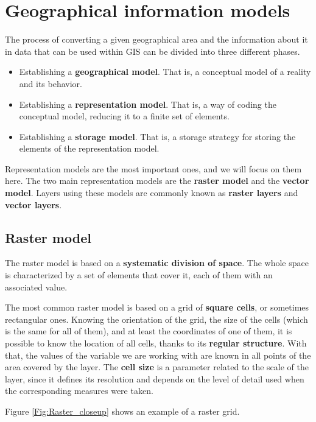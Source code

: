 \section{Geographical information models}

The process of converting a given geographical area and the information about it in data that can be used within GIS can be divided into three different phases.

\begin{itemize}
 \item Establishing a \textbf{geographical model}. That is, a conceptual model of a reality and its behavior.
\item Establishing a \textbf{representation model}. That is, a way of coding the conceptual model, reducing it to a finite set of elements.
\item Establishing a \textbf{storage model}. That is, a storage strategy for storing the elements of the representation model.
\end{itemize}

Representation models are the most important ones, and we will focus on them here. The two main representation models are the \textbf{raster model} and the \textbf{vector model}. Layers using these models are commonly known as \textbf{raster layers} and \textbf{vector layers}.

\subsection{Raster model}

The raster model is based on a \textbf{systematic division of space}. The whole space is characterized by a set of elements that cover it, each of them with an associated value.

The most common raster model is based on a grid of \textbf{square cells}, or sometimes rectangular ones. Knowing the orientation of the grid, the size of the cells (which is the same for all of them), and at least the coordinates of one of them, it is possible to know the location of all cells, thanks to its \textbf{regular structure}. With that, the values of the variable we are working with are known in all points of the area covered by the layer. The \textbf{cell size} is a parameter related to the scale of the layer, since it defines its resolution and depends on the level of detail used when the corresponding measures were taken.

Figure \ref{Fig:Raster_closeup} shows an example of a raster grid.

